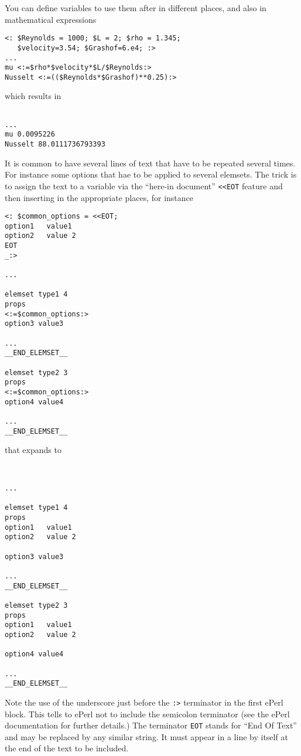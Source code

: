 
You can define variables to use them after in different places, and
also in mathematical expressions

\begin{verbatim}
<: $Reynolds = 1000; $L = 2; $rho = 1.345; 
   $velocity=3.54; $Grashof=6.e4; :>
...
mu <:=$rho*$velocity*$L/$Reynolds:>
Nusselt <:=(($Reynolds*$Grashof)**0.25):>
\end{verbatim}
%
which results in
%
\begin{verbatim}

...
mu 0.0095226
Nusselt 88.0111736793393
\end{verbatim}

 
It is common to have several lines of text that have to be repeated
several times. For instance some options that hae to be applied to
several elemsets. The trick is to assign the text to a variable via
the ``here-in document'' \verb+<<EOT+ feature and then inserting in
the appropriate places, for instance

\begin{verbatim}
<: $common_options = <<EOT;
option1   value1
option2   value 2
EOT
_:>

...

elemset type1 4
props
<:=$common_options:>
option3 value3

...
__END_ELEMSET__

elemset type2 3
props
<:=$common_options:>
option4 value4

...
__END_ELEMSET__
\end{verbatim}
%
that expands to
%
\begin{verbatim}


...

elemset type1 4
props
option1   value1
option2   value 2

option3 value3

...
__END_ELEMSET__

elemset type2 3
props
option1   value1
option2   value 2

option4 value4

...
__END_ELEMSET__
\end{verbatim}

Note the use of the underscore just before the \verb+:>+ terminator in
the first ePerl block. This tells to ePerl not to include the
semicolon terminator (see the ePerl documentation for further
details.) The terminator \verb+EOT+ stands for ``End Of Text'' and may
be replaced by any similar string. It must appear in a line by itself
at the end of the text to be included. 

